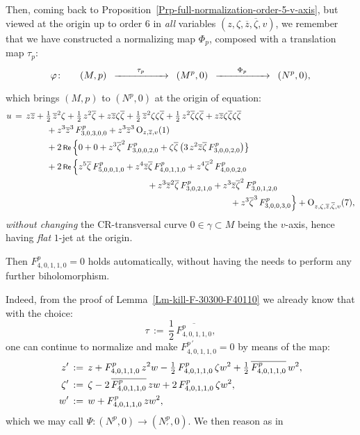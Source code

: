 \documentclass[12pt,twoside,leqno,openany]{amsart}
\begin{document}
Then, coming back to
Proposition~{\ref{Prp-full-normalization-order-5-v-axis}},
but viewed at the origin up to order $6$
in {\em all} variables $(z, \zeta, \overline{z}, \overline{\zeta},
v)$,  
we remember that we have constructed a normalizing map $\Phi_p$,
composed with a translation map $\tau_p$:
\[
\varphi
\colon\ \ \ \ \
(M,p)
\,\,\,\xrightarrow[{\rule[0pt]{50pt}{0pt}}]{\tau_p}\,\,\,
(M^p,0)
\,\,\,\xrightarrow[{\rule[0pt]{50pt}{0pt}}]{\Phi_p}\,\,\,
(N^p,0),
\]
which brings $(M, p)$ to $(N^p, 0)$ at the origin of equation:
\[
\aligned
u
&
\,=\,
z\overline{z}
+
\tfrac{1}{2}\,\overline{z}^2\zeta
+
\tfrac{1}{2}\,z^2\overline{\zeta}
+
z\overline{z}\zeta\overline{\zeta}
+
\tfrac{1}{2}\,\overline{z}^2\zeta\zeta\overline{\zeta}
+
\tfrac{1}{2}\,z^2\overline{\zeta}\zeta\overline{\zeta}
+
z\overline{z}\zeta\overline{\zeta}\zeta\overline{\zeta}
\\
&
\ \ \ \ \ \ \ \ \ \ \ \ 
+
z^3\overline{z}^3\,F_{3,0,3,0,0}^p
+
z^3\overline{z}^3\,
{\rm O}_{z,\overline{z},v}(1)
\\
&
\ \ \ \ \ \ \ \ \ \ \ \ 
+
2\,\Re\,
\Big\{
0
+
0
+
z^3\overline{\zeta}^2\,
F_{3,0,0,2,0}^p
+
\zeta\overline{\zeta}\,
\big(
3\,z^2\overline{z}\overline{\zeta}\,
F_{3,0,0,2,0}^p
\big)
\big\}
\\
&
\ \ \ \ \ \ \ \ \ \ \ \ 
+
2\,\Re\,
\Big\{
z^5\overline{\zeta}\,
F_{5,0,0,1,0}^p
+
z^4\overline{z}\overline{\zeta}\,
F_{4,0,1,1,0}^p
+
z^4\overline{\zeta}^2\,
F_{4,0,0,2,0}^p
\\
&
\ \ \ \ \ \ \ \ \ \ \ \ \ \ \ \ \ \ \ \ \ \ \ \ \ \ \ \ \ \ \ \ \ \ \ 
\ \ \ \ \ \ \ \ \ \ \ \,
+
z^3\overline{z}^2\overline{\zeta}\,
F_{3,0,2,1,0}^p
+
z^3\overline{z}\overline{\zeta}^2\,
F_{3,0,1,2,0}^p
\\
&
\ \ \ \ \ \ \ \ \ \ \ \ \ \ \ \ \ \ \ \ \ \ \ \ \ \ \ \ \ \ \ \ \ \ \
\ \ \ \ \ \ \ \ \ \ \ \ \ \ \ \ \ \ \ \ \ \ \ \ \ \ \ \ \ \ \ \ \ \ \
\ \ \ \ \
+
z^3\overline{\zeta}^3\,
F_{3,0,0,3,0}^p
\Big\}
+
{\rm O}_{z,\zeta,\overline{z},\overline{\zeta},v}(7),
\endaligned
\]
{\em without changing} the CR-transversal curve 
$0 \in \gamma \subset M$ being the $v$-axis,
hence having {\em flat} $1$-jet at the origin.

\begin{Assertion}
\label{Assertion-F-40110-zero}
Then $F_{4,0,1,1,0}^p = 0$ holds automatically, without
having the needs to perform any further biholomorphism.
\end{Assertion}

\proof
Indeed, from the proof of Lemma~{\ref{Lm-kill-F-30300-F40110}}
we already know that with the choice:
\[
\tau 
\,:=\,
\frac{1}{2}\,
\overline{F_{4,0,1,1,0}^p},
\]
one can continue to normalize
and make $F_{4,0,1,1,0}^{p\,\prime} = 0$ by means of the map:
\[
\aligned
z'
&
\,:=\,
z
+
F_{4,0,1,1,0}^p\,
z^2w
-
\tfrac{1}{2}\,
F_{4,0,1,1,0}^p\,
\zeta w^2
+
\tfrac{1}{2}\,
\overline{F_{4,0,1,1,0}^p}\,
w^2,
\\
\zeta'
&
\,:=\,
\zeta
-
2\,\overline{F_{4,0,1,1,0}^p}\,
zw
+
2\,F_{4,0,1,1,0}^p\,
\zeta w^2,
\\
w'
&
\,:=\,
w
+
F_{4,0,1,1,0}^p\,
zw^2,
\endaligned
\]
which we may call $\Psi \colon (N^p, 0) \longrightarrow
(N_\prime^p, 0)$.
We then reason as in~{\cite[9.5]{Merker-2020}}
\end{document}
